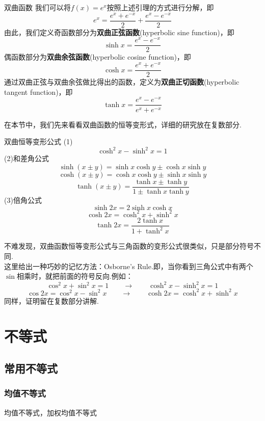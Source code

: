 \documentclass[lang=cn, zihao=4.5]{elegantbook}
\begin{document}
\begin{definition}{双曲函数}
    我们可以将$f(x)=e^x$按照上述引理的方式进行分解，即$$e^x=\frac{e^x+e^{-x}}{2}+\frac{e^x-e^{-x}}{2}$$
    由此，我们定义奇函数部分为\textbf{双曲正弦函数}(hyperbolic sine function)，即$$\sinh{x}=\frac{e^x-e^{-x}}{2}$$
    偶函数部分为\textbf{双曲余弦函数}(hyperbolic cosine function)，即$$\cosh{x}=\frac{e^x+e^{-x}}{2}$$
    通过双曲正弦与双曲余弦做比得出的函数，定义为\textbf{双曲正切函数}(hyperbolic tangent function)，即$$\tanh{x}=\frac{e^x-e^{-x}}{e^x+e^{-x}}$$
\end{definition}

在本节中，我们先来看看双曲函数的恒等变形式，详细的研究放在复数部分.

\begin{proposition}{双曲恒等变形公式}
    (1)$$\cosh^2{x}-\sinh^2{x}=1$$
    (2)和差角公式
    $$\sinh{(x \pm y)}=\sinh{x}\cosh{y} \pm \cosh{x}\sinh{y}$$
    $$\cosh{(x \pm y)}=\cosh{x}\cosh{y} \pm \sinh{x}\sinh{y}$$
    $$\tanh{(x \pm y)}=\frac{\tanh{x} \pm \tanh{y}}{1 \pm \tanh{x}\tanh{y}}$$
    (3)倍角公式
    $$\sinh{2x}=2\sinh{x}\cosh{x}$$
    $$\cosh{2x}=\cosh^2{x}+\sinh^2{x}$$
    $$\tanh{2x}=\frac{2\tanh{x}}{1+\tanh^2{x}}$$
\end{proposition}
\begin{remark}
    不难发现，双曲函数恒等变形公式与三角函数的变形公式很类似，只是部分符号不同.\\
    这里给出一种巧妙的记忆方法：Osborne's Rule.即，当你看到三角公式中有两个$\sin$相乘时，就把前面的符号反向.例如：$$\cos^2{x}+\sin^2{x}=1 \qquad \longrightarrow \qquad \cosh^2{x}-\sinh^2{x}=1$$
    $$\cos{2x}=\cos^2{x}-\sin^2{x} \qquad \longrightarrow \qquad \cosh{2x}=\cosh^2{x}+\sinh^2{x}$$
    同样，证明留在复数部分讲解.
\end{remark}


\chapter{不等式}

\section{常用不等式}

\subsection{均值不等式}

均值不等式，加权均值不等式
\end{document}

